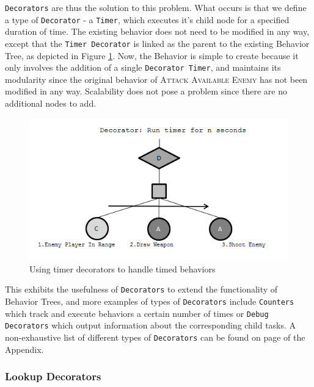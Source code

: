             \texttt{Decorators} are thus the solution to this problem. What occurs is that we define a type of \texttt{Decorator} - a \texttt{Timer}, which executes it's child node for a specified duration of time. The existing behavior does not need to be modified in any way, except that the \texttt{Timer Decorator} is linked as the parent to the existing Behavior Tree, as depicted in Figure \ref{img:timer}. Now, the Behavior is simple to create because it only involves the addition of a single \texttt{Decorator Timer}, and maintains its modularity since the original behavior of \textsc{Attack Available Enemy} has not been modified in any way. Scalability does not pose a problem since there are no additional nodes to add.
            
            \begin{figure}[h]
                
                \begin{center}
                \includegraphics[scale=0.6]{images/decorator.png}
                \caption{Using timer decorators to handle timed behaviors}
                \label{img:timer}
                \end{center}            
            \end{figure}  

            This exhibits the usefulness of \texttt{Decorators} to extend the functionality of Behavior Trees, and more examples of types of \texttt{Decorators} include \texttt{Counters} which track and execute behaviors a certain number of times or \texttt{Debug Decorators} which output information about the corresponding child tasks. A non-exhaustive list of different types of \texttt{Decorators} can be found on page \pageref{app:decorators} of the Appendix.
            
            \subsubsection{Lookup Decorators}
            
